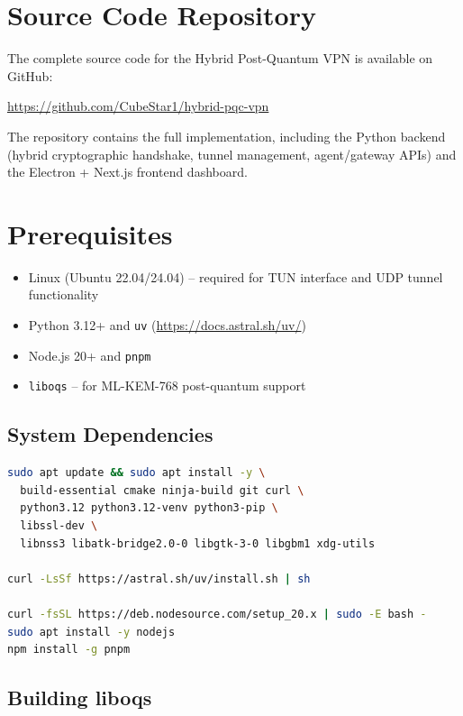 
\section{Source Code Repository}

The complete source code for the Hybrid Post-Quantum VPN is available on GitHub:

\begin{center}
\url{https://github.com/CubeStar1/hybrid-pqc-vpn}
\end{center}

The repository contains the full implementation, including the Python backend (hybrid cryptographic handshake, tunnel management, agent/gateway APIs) and the Electron + Next.js frontend dashboard.

\section{Prerequisites}

\begin{itemize}
    \item Linux (Ubuntu 22.04/24.04) -- required for TUN interface and UDP tunnel functionality
    \item Python 3.12+ and \texttt{uv} (\url{https://docs.astral.sh/uv/})
    \item Node.js 20+ and \texttt{pnpm}
    \item \texttt{liboqs} -- for ML-KEM-768 post-quantum support
\end{itemize}

\subsection{System Dependencies}

\begin{lstlisting}[language=bash, caption={Install System Dependencies}]
sudo apt update && sudo apt install -y \
  build-essential cmake ninja-build git curl \
  python3.12 python3.12-venv python3-pip \
  libssl-dev \
  libnss3 libatk-bridge2.0-0 libgtk-3-0 libgbm1 xdg-utils

curl -LsSf https://astral.sh/uv/install.sh | sh

curl -fsSL https://deb.nodesource.com/setup_20.x | sudo -E bash -
sudo apt install -y nodejs
npm install -g pnpm
\end{lstlisting}

\subsection{Building liboqs}

